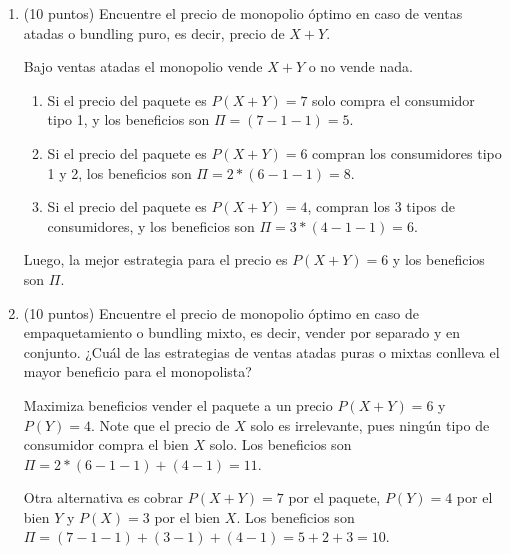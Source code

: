 \documentclass{exam}
\begin{document}
\begin{enumerate}
    \item (10 puntos) Encuentre el precio de monopolio óptimo en caso de ventas atadas o bundling puro, es decir, precio de $X+Y$.
    \begin{solution}
        Bajo ventas atadas el monopolio vende $X+Y$ o no vende nada.
        \begin{enumerate}
            \item Si el precio del paquete es $P(X+Y) = 7$ solo compra el consumidor tipo 1, y los beneficios son $\Pi = (7 - 1 - 1) = 5$.
            \item Si el precio del paquete es $P(X+Y) = 6$ compran los consumidores tipo 1 y 2, los beneficios son $\Pi = 2 * (6 - 1 - 1) = 8$.
            \item Si el precio del paquete es $P(X+Y) = 4$, compran los 3 tipos de consumidores, y los beneficios son $\Pi = 3 * (4 - 1 - 1) = 6$.
        \end{enumerate}
        Luego, la mejor estrategia para el precio es $P(X+Y) = 6$ y los beneficios son $\Pi$.
    \end{solution}
    
    \item (10 puntos) Encuentre el precio de monopolio óptimo en caso de empaquetamiento o bundling mixto, es decir, vender por separado y en conjunto. ¿Cuál de las estrategias de ventas atadas puras o mixtas conlleva el mayor beneficio para el monopolista?
    \begin{solution}
        Maximiza beneficios vender el paquete a un precio $P(X+Y) = 6$ y $P(Y) = 4$. Note que el precio de $X$ solo es irrelevante, pues ningún tipo de consumidor compra el bien $X$ solo. Los beneficios son $\Pi = 2 * (6 - 1 - 1) + (4 - 1) = 11$.

        Otra alternativa es cobrar $P(X+Y) = 7$ por el paquete, $P(Y) = 4$ por el bien $Y$ y $P(X) = 3$ por el bien $X$. Los beneficios son $\Pi = (7 - 1 - 1) + (3 - 1) + (4 - 1) = 5 + 2 + 3 = 10$.
    \end{solution}
\end{enumerate}
\end{document}
